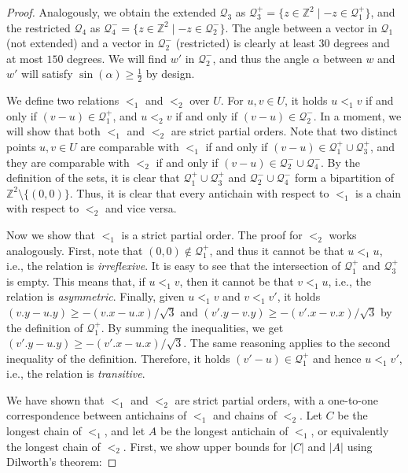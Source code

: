 \documentclass[11pt, letterpaper]{article}
\theoremstyle{plain}
\theoremstyle{definition}
\theoremstyle{remark}
\newcommand{\Q}{\mathcal{Q}}
\newcommand{\absolute}[1]{\left\lvert#1\right\rvert}
\begin{document}
\begin{proof}
%

%
Analogously, we obtain the extended $\Q_3$ as $\Q_3^+ = \{ z \in \mathbb Z^2 \mid -z \in \Q_1^+ \}$, and the restricted $\Q_4$ as $\Q_4^- = \{ z \in \mathbb Z^2 \mid -z \in \Q_2^- \}$. The angle between a vector in $\Q_1$ (not extended) and a vector in $\Q_2^-$ (restricted) is clearly at least $30$ degrees and at most $150$ degrees. We will find $w'$ in $\Q_2^-$, and thus the angle $\alpha$ between $w$ and $w'$ will satisfy $\sin(\alpha) \geq \frac12$ by design.

We define two relations $<_1$ and $<_2$ over $U$. For $u, v \in U$, it holds $u <_1 v$ if and only if $(v - u) \in \Q_1^+$, and $u <_2 v$ if and only if $(v - u) \in \Q_2^-$. In a moment, we will show that both $<_1$ and $<_2$ are strict partial orders. 
Note that two distinct points $u,v \in U$ are comparable with $<_1$ if and only if $(v - u) \in \Q_1^+ \cup \Q_3^+$, and they are comparable with $<_2$ if and only if $(v - u) \in \Q_2^- \cup \Q_4^-$. 
By the definition of the sets, it is clear that $\Q_1^+ \cup \Q_3^+$ and $\Q_2^- \cup \Q_4^-$ form a bipartition of $\mathbb Z^2 \setminus \{(0,0)\}$.
Thus, it is clear that every antichain with respect to $<_1$ is a chain with respect to $<_2$ and vice versa.

Now we show that $<_1$ is a strict partial order. The proof for $<_2$ works analogously. First, note that $(0,0) \notin \Q_1^+$, and thus it cannot be that $u <_1 u$, i.e., the relation is \emph{irreflexive}. It is easy to see that the intersection of $\Q_1^+$ and $\Q_3^+$ is empty. This means that, if $u <_1 v$, then it cannot be that $v <_1 u$, i.e., the relation is \emph{asymmetric}. Finally, given $u <_1 v$ and $v <_1 v'$, it holds $(v.y - u.y) \geq -(v.x-u.x)/\sqrt{3}$ and $(v'.y - v.y) \geq -(v'.x-v.x)/\sqrt{3}$ by the definition of $\Q_1^+$. By summing the inequalities, we get $(v'.y - u.y) \geq -(v'.x-u.x)/\sqrt{3}$. The same reasoning applies to the second inequality of the definition. Therefore, it holds $(v' - u) \in \Q_1^+$ and hence $u <_1 v'$, i.e., the relation is \emph{transitive}.

We have shown that $<_1$ and $<_2$ are strict partial orders, with a one-to-one correspondence between antichains of $<_1$ and chains of $<_2$.
Let $C$ be the longest chain of $<_1$, and let $A$ be the longest antichain of $<_1$, or equivalently the longest chain of $<_2$. First, we show upper bounds for $\absolute{C}$ and $\absolute{A}$ using Dilworth's theorem:


\end{proof}
\end{document}
